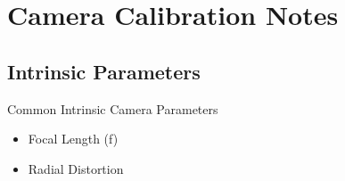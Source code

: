 \chapter*{Camera Calibration Notes}

\section*{Intrinsic Parameters}

Common Intrinsic Camera Parameters
\begin{itemize}
\item Focal Length (f)
\item Radial Distortion
\end{itemize}


